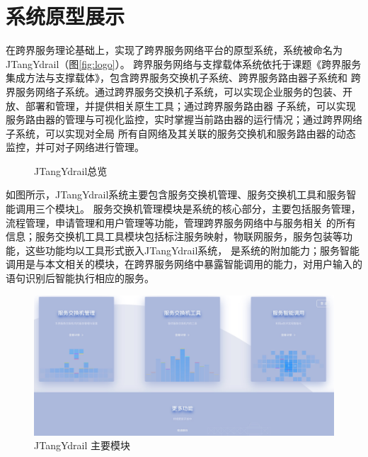 \section{系统原型展示}
在跨界服务理论基础上，实现了跨界服务网络平台的原型系统，系统被命名为JTangYdrail（图\ref{fig:logo}）。
跨界服务网络与支撑载体系统依托于课题《跨界服务集成方法与支撑载体》，包含跨界服务交换机子系统、跨界服务路由器子系统和
跨界服务网络子系统。通过跨界服务交换机子系统，可以实现企业服务的包装、开放、部署和管理，并提供相关原生工具；通过跨界服务路由器
子系统，可以实现服务路由器的管理与可视化监控，实时掌握当前路由器的运行情况；通过跨界网络子系统，可以实现对全局
所有自网络及其关联的服务交换机和服务路由器的动态监控，并可对子网络进行管理。

\begin{figure}[htbp]
  \caption{JTangYdrail总览}
  \end{figure}
  如图所示，JTangYdrail系统主要包含服务交换机管理、服务交换机工具和服务智能调用三个模块\ref{fig:sangemokuai}。
  服务交换机管理模块是系统的核心部分，主要包括服务管理，流程管理，申请管理和用户管理等功能，管理跨界服务网络中与服务相关
  的所有信息；服务交换机工具工具模块包括标注服务映射，物联网服务，服务包装等功能，这些功能均以工具形式嵌入JTangYdrail系统，
  是系统的附加能力；服务智能调用是与本文相关的模块，在跨界服务网络中暴露智能调用的能力，对用户输入的语句识别后智能执行相应的服务。

  \begin{figure}[htbp]
    \centering
    \includegraphics[width=17cm]{./images/sangemokuai.png}
    \caption{JTangYdrail 主要模块}
    \label{fig:sangemokuai}
  \end{figure}

